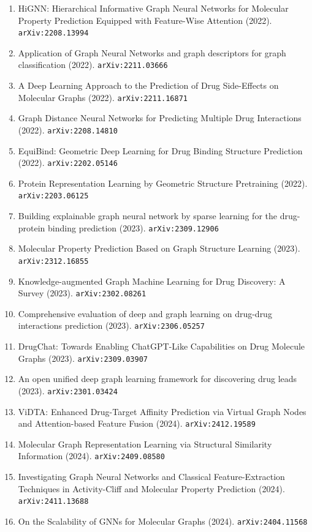 \documentclass[11pt]{article}
\begin{document}
\begin{enumerate}
  \item HiGNN: Hierarchical Informative Graph Neural Networks for Molecular
  Property Prediction Equipped with Feature-Wise Attention (2022). \texttt{arXiv:2208.13994}
  \item Application of Graph Neural Networks and graph descriptors for graph
  classification (2022). \texttt{arXiv:2211.03666}
  \item A Deep Learning Approach to the Prediction of Drug Side-Effects on
  Molecular Graphs (2022). \texttt{arXiv:2211.16871}
  \item Graph Distance Neural Networks for Predicting Multiple Drug Interactions (2022). \texttt{arXiv:2208.14810}
  \item EquiBind: Geometric Deep Learning for Drug Binding Structure Prediction (2022). \texttt{arXiv:2202.05146}
  \item Protein Representation Learning by Geometric Structure Pretraining (2022). \texttt{arXiv:2203.06125}
  \item Building explainable graph neural network by sparse learning for the
  drug-protein binding prediction (2023). \texttt{arXiv:2309.12906}
  \item Molecular Property Prediction Based on Graph Structure Learning (2023). \texttt{arXiv:2312.16855}
  \item Knowledge-augmented Graph Machine Learning for Drug Discovery: A Survey (2023). \texttt{arXiv:2302.08261}
  \item Comprehensive evaluation of deep and graph learning on drug-drug
  interactions prediction (2023). \texttt{arXiv:2306.05257}
  \item DrugChat: Towards Enabling ChatGPT-Like Capabilities on Drug Molecule
  Graphs (2023). \texttt{arXiv:2309.03907}
  \item An open unified deep graph learning framework for discovering drug leads (2023). \texttt{arXiv:2301.03424}
  \item ViDTA: Enhanced Drug-Target Affinity Prediction via Virtual Graph Nodes
  and Attention-based Feature Fusion (2024). \texttt{arXiv:2412.19589}
  \item Molecular Graph Representation Learning via Structural Similarity
  Information (2024). \texttt{arXiv:2409.08580}
  \item Investigating Graph Neural Networks and Classical Feature-Extraction
  Techniques in Activity-Cliff and Molecular Property Prediction (2024). \texttt{arXiv:2411.13688}
  \item On the Scalability of GNNs for Molecular Graphs (2024). \texttt{arXiv:2404.11568}

\end{enumerate}
\end{document}
